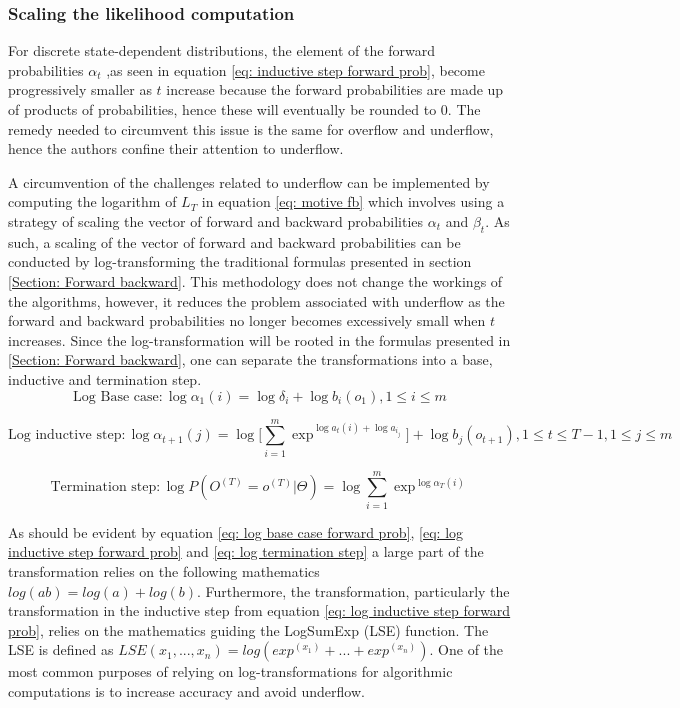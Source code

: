 \subsubsection{Scaling the likelihood computation}
For discrete state-dependent distributions, the element of the forward probabilities $\alpha_t$ ,as seen in equation \ref{eq: inductive step forward prob}, become progressively smaller as $t$ increase because the forward probabilities are made up of products of probabilities, hence these will eventually be rounded to 0. The remedy needed to circumvent this issue is the same for overflow and underflow, hence the authors confine their attention to underflow.

A circumvention of the challenges related to underflow can be implemented by computing the logarithm of $L_T$ in equation \ref{eq: motive fb} which involves using a strategy of scaling the vector of forward and backward probabilities $\alpha_t$ and $\beta_t$. As such, a scaling of the vector of forward and backward probabilities can be conducted by log-transforming the  traditional formulas presented in section \ref{Section: Forward backward}. This methodology does not change the workings of the algorithms, however, it reduces the problem associated with underflow as the forward and backward probabilities no longer becomes excessively small when $t$ increases. Since the log-transformation will be rooted in the formulas presented in \ref{Section: Forward backward}, one can separate the transformations into a base, inductive and termination step.  
\begin{equation}
    \text{Log Base case}: \log\alpha_1(i) = \log\delta_i + \log b_i(o_1),  1 \leq i \leq m
    \label{eq: log base case forward prob}
\end{equation}

\begin{equation}
    \text{Log inductive step}: \log\alpha_{t+1}(j) = \log\Big[\sum_{i=1}^m \exp^{\log a_t(i)+\log a_i_j}\Big] + \log b_j(o_{t+1}), 1\leq t \leq T - 1,
    1 \leq j \leq m
    \label{eq: log inductive step forward prob}
\end{equation}

\begin{equation}
     \text{Termination step}: \log P(O^{(T)} = o^{(T)}|\Theta) = \log\sum_{i=1}^m \exp^{\log\alpha_T(i)}
    \label{eq: log termination step}
\end{equation}

As should be evident by equation \ref{eq: log base case forward prob}, \ref{eq: log inductive step forward prob} and \ref{eq: log termination step} a large part of the transformation relies on the following mathematics $log(ab) = log(a) + log(b)$. Furthermore, the transformation, particularly the transformation in the inductive step from equation \ref{eq: log inductive step forward prob}, relies on the mathematics guiding the LogSumExp (LSE) function. The LSE is defined as $LSE(x_1,...,x_n) = log(exp^{(x_1)}+...+exp^{(x_n)})$. One of the most common purposes of relying on log-transformations for algorithmic computations is to increase accuracy and avoid underflow. 

